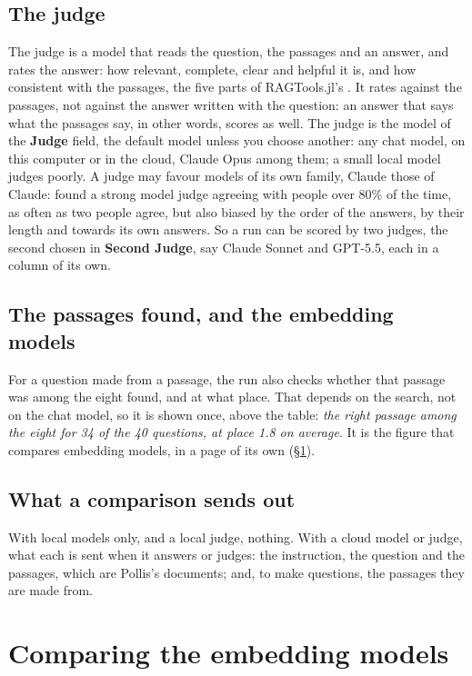 \subsection{The judge}\label{sec:judge}
The judge is a model that reads the question, the passages and an answer, and rates the answer: how relevant,
complete, clear and helpful it is, and how consistent with the passages, the five parts of RAGTools.jl's
. It rates against the passages, not against the answer written with the question: an answer that
says what the passages say, in other words, scores as well. The judge is the model of the \textbf{Judge} field, the default model
unless you choose another: any chat model, on this computer or in the cloud, Claude Opus among them; a small local
model judges poorly. A judge may favour models of its own family, Claude those of Claude:  found a strong model judge agreeing with people over 80\% of the time, as often as two people agree, but
also biased by the order of the answers, by their length and towards its own answers. So a run can be scored by two
judges, the second chosen in \textbf{Second Judge}, say Claude Sonnet and GPT-5.5, each in a column of its own.

\subsection{The passages found, and the embedding models}
For a question made from a passage, the run also checks whether that passage was among the eight found, and at what
place. That depends on the search, not on the chat model, so it is shown once, above the table: \emph{the right
passage among the eight for 34 of the 40 questions, at place 1.8 on average}. It is the figure that compares embedding
models, in a page of its own (\S\ref{sec:compareEmbeddings}).

\subsection{What a comparison sends out}
With local models only, and a local judge, nothing. With a cloud model or judge, what each is sent when it answers or
judges: the instruction, the question and the passages, which are Pollis's documents; and, to make questions, the
passages they are made from.

\section{Comparing the embedding models}\label{sec:compareEmbeddings}

